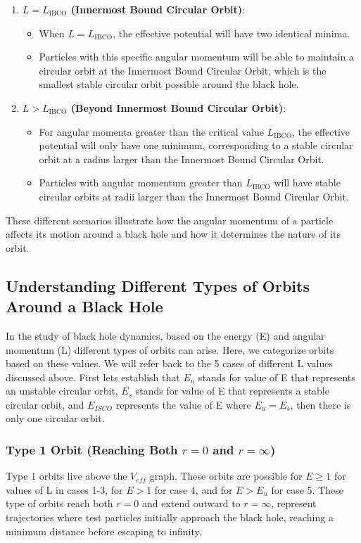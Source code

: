 \documentclass{article}
\begin{document}
\begin{enumerate}
    \item \textbf{\( L = L_{\text{IBCO}} \) (Innermost Bound Circular Orbit)}:
    \begin{itemize}
        \item When \( L = L_{\text{IBCO}} \), the effective potential will have two identical minima.
        \item Particles with this specific angular momentum will be able to maintain a circular orbit at the Innermost Bound Circular Orbit, which is the smallest stable circular orbit possible around the black hole.
    \end{itemize}
    
    \item \textbf{\( L > L_{\text{IBCO}} \) (Beyond Innermost Bound Circular Orbit)}:
    \begin{itemize}
        \item For angular momenta greater than the critical value \( L_{\text{IBCO}} \), the effective potential will only have one minimum, corresponding to a stable circular orbit at a radius larger than the Innermost Bound Circular Orbit.
        \item Particles with angular momentum greater than \( L_{\text{IBCO}} \) will have stable circular orbits at radii larger than the Innermost Bound Circular Orbit.
    \end{itemize}
\end{enumerate}

These different scenarios illustrate how the angular momentum of a particle affects its motion around a black hole and how it determines the nature of its orbit.

\subsection{Understanding Different Types of Orbits Around a Black Hole}
In the study of black hole dynamics, based on the energy (E) and angular momentum (L) different types of orbits can arise.
Here, we categorize orbits based on these values. We will refer back to the 5 cases of different L values discussed above.
First lets establish that $E_u$ stands for value of E that represents an unstable circular orbit,
$E_s$ stands for value of E that represents a stable circular orbit, and $E_{ISCO}$ represents the
value of E where $E_u = E_s$, then there is only one circular orbit.
\subsubsection{Type 1 Orbit (Reaching Both $r = 0$ and $r = \infty$)}
Type 1 orbits live above the $ V_{eff} $ graph. These orbits are possible for $ E\geq 1 $ for values of L in cases 1-3,
for $ E > 1 $ for case 4, and for $ E > E_u $ for case 5. These type of orbits reach both $r=0$ and extend outward to
$ r = \infty $, represent trajectories where test particles initially approach the black hole, reaching a minimum distance before escaping to infinity.
\end{document}
